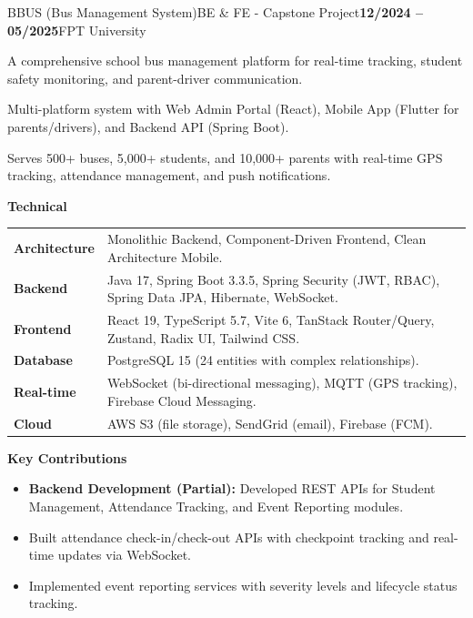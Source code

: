 \documentclass[]{style}
\newcommand{\bolddate}[1]{\textbf{#1}}
\begin{document}
\begin{section}
 \begin{projectsubsection}{BBUS (Bus Management System)}{BE \& FE - Capstone Project}{\bolddate{12/2024 -- 05/2025}}{FPT University}
   \item A comprehensive school bus management platform for real-time tracking, student safety monitoring, and parent-driver communication.
   \item Multi-platform system with Web Admin Portal (React), Mobile App (Flutter for parents/drivers), and Backend API (Spring Boot).
   \item Serves 500+ buses, 5,000+ students, and 10,000+ parents with real-time GPS tracking, attendance management, and push notifications.
   \item \textbf{Technical} \\
   \begin{tabularx}{\linewidth}[t]{ @{} >{\bfseries}l @{\hspace{1ex}} X @{} }
     Architecture & Monolithic Backend, Component-Driven Frontend, Clean Architecture Mobile.                       \\
     Backend      & Java 17, Spring Boot 3.3.5, Spring Security (JWT, RBAC), Spring Data JPA, Hibernate, WebSocket. \\
     Frontend     & React 19, TypeScript 5.7, Vite 6, TanStack Router/Query, Zustand, Radix UI, Tailwind CSS.       \\
     Database     & PostgreSQL 15 (24 entities with complex relationships).                                         \\
     Real-time    & WebSocket (bi-directional messaging), MQTT (GPS tracking), Firebase Cloud Messaging.            \\
     Cloud        & AWS S3 (file storage), SendGrid (email), Firebase (FCM).                                        \\
   \end{tabularx}
   \item \textbf{Key Contributions}
   \begin{itemize}
     \item \textbf{Backend Development (Partial):} Developed REST APIs for Student Management, Attendance Tracking, and Event Reporting modules.
     \item Built attendance check-in/check-out APIs with checkpoint tracking and real-time updates via WebSocket.
     \item Implemented event reporting services with severity levels and lifecycle status tracking.

\end{itemize}
\end{projectsubsection}
\end{section}
\end{document}
